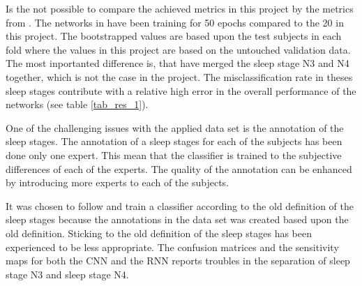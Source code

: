 Is the not possible to compare the achieved metrics in this project by the metrics from \cite{main_ar}. The networks in  \cite{main_ar} have been training for 50 epochs compared to the 20 in this project. The bootstrapped values are based upon the test subjects in each fold where the values in this project are based on the untouched validation data. The most inportanted difference is, that \cite{main_ar} have merged the sleep stage N3 and N4 together, which is not the case in the project. The misclassification rate in theses sleep stages contribute with a relative high error in the overall performance of the networks (see table \ref{tab_res_1}).

One of the challenging issues with the applied data set is the annotation of the sleep stages. The annotation of a sleep stages for each of the subjects has been done only one expert. This mean that the classifier is trained to the subjective differences of each of the experts. The quality of the annotation can be enhanced by introducing more experts to each of the subjects.

It was chosen to follow and train a classifier according to the old definition of the sleep stages because the annotations in the data set was created based upon the old definition. Sticking to the old definition of the sleep stages has been experienced to be less appropriate. The confusion matrices and the sensitivity maps for both the CNN and the RNN reports troubles in the separation of sleep stage N3 and sleep stage N4. 
